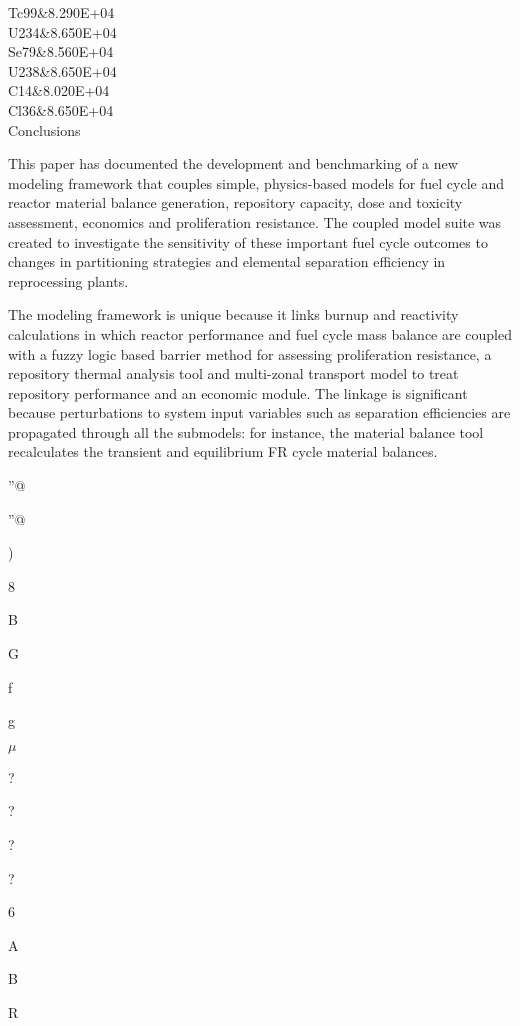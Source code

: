Tc99&8.290E+04\\

U234&8.650E+04\\

Se79&8.560E+04\\

U238&8.650E+04\\

C14&8.020E+04\\

Cl36&8.650E+04\\



Conclusions

	This paper has documented the development and benchmarking of a new
modeling framework that couples simple, physics-based models for fuel
cycle and reactor material balance generation, repository capacity, dose
and toxicity assessment, economics and proliferation resistance.  The
coupled model suite was created to investigate the sensitivity of these
important fuel cycle outcomes to changes in partitioning strategies and
elemental separation efficiency in reprocessing plants.

	The modeling framework is unique because it links burnup and reactivity
calculations in which reactor performance and fuel cycle mass balance
are coupled with a fuzzy logic based barrier method for assessing
proliferation resistance, a repository thermal analysis tool and
multi-zonal transport model to treat repository performance and an
economic module.  The linkage is significant because perturbations to
system input variables such as separation efficiencies are propagated
through all the submodels: for instance, the material balance tool
recalculates the transient and equilibrium FR cycle material balances.

''@

\asciicircum{}''@

)

8

B

G

f

g

$\mu$

?

?

?

?

6

A

B

R

